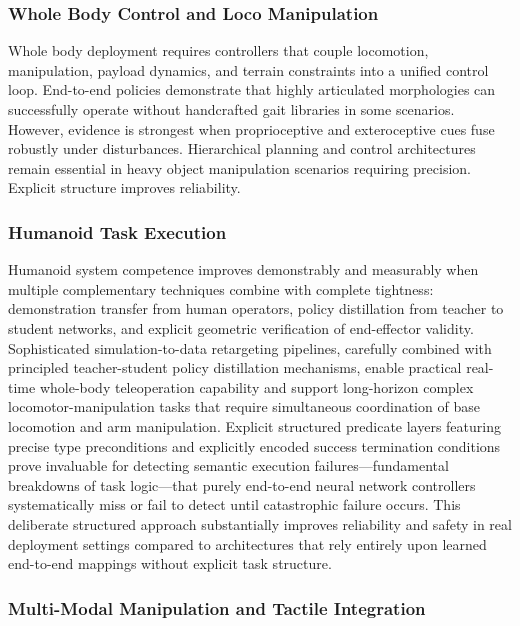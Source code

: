 ﻿\documentclass[11pt,a4paper]{article}
\begin{document}
\subsubsection{Whole Body Control and Loco Manipulation}

Whole body deployment requires controllers that couple locomotion, manipulation, payload dynamics, and terrain constraints into a unified control loop. End-to-end policies demonstrate that highly articulated morphologies can successfully operate without handcrafted gait libraries in some scenarios. However, evidence is strongest when proprioceptive and exteroceptive cues fuse robustly under disturbances. Hierarchical planning and control architectures remain essential in heavy object manipulation scenarios requiring precision. Explicit structure improves reliability.

\subsubsection{Humanoid Task Execution}

Humanoid system competence improves demonstrably and measurably when multiple complementary techniques combine with complete tightness: demonstration transfer from human operators, policy distillation from teacher to student networks, and explicit geometric verification of end-effector validity. Sophisticated simulation-to-data retargeting pipelines, carefully combined with principled teacher-student policy distillation mechanisms, enable practical real-time whole-body teleoperation capability and support long-horizon complex locomotor-manipulation tasks that require simultaneous coordination of base locomotion and arm manipulation. Explicit structured predicate layers featuring precise type preconditions and explicitly encoded success termination conditions prove invaluable for detecting semantic execution failures—fundamental breakdowns of task logic—that purely end-to-end neural network controllers systematically miss or fail to detect until catastrophic failure occurs. This deliberate structured approach substantially improves reliability and safety in real deployment settings compared to architectures that rely entirely upon learned end-to-end mappings without explicit task structure.

\subsubsection{Multi-Modal Manipulation and Tactile Integration}
\end{document}
